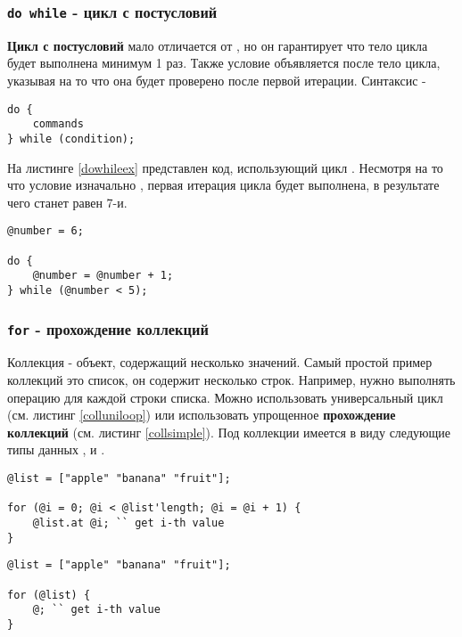 \documentclass[a4paper, 14pt]{extarticle}
\begin{document}
\subsubsection{\lstinline`do while` - цикл с постусловий}

{\bf Цикл с постусловий} мало отличается от , но он гарантирует что тело цикла будет выполнена минимум 1 раз. Также условие объявляется после тело цикла, указывая на то что она будет проверено после первой итерации. Синтаксис -
\begin{lstlisting}[numbers=none]
do {
	commands
} while (condition);
\end{lstlisting}

На листинге \ref{dowhileex} представлен код, использующий цикл . Несмотря на то что условие изначально , первая итерация цикла будет выполнена, в результате чего  станет равен 7-и.

\begin{lstlisting}[caption=Цикл do while, label=dowhileex]
@number = 6;

do {
	@number = @number + 1;
} while (@number < 5);
\end{lstlisting}

\subsubsection{\lstinline`for` - прохождение коллекций}

{Коллекция} - объект, содержащий несколько значений. Самый простой пример коллекций это список, он содержит несколько строк. Например, нужно выполнять операцию для каждой строки списка. Можно использовать универсальный цикл (см. листинг \ref{colluniloop}) или использовать упрощенное {\bf прохождение коллекций} (см. листинг \ref{collsimple}). Под коллекции имеется в виду следующие типы данных ,  и .
\begin{lstlisting}[caption=Прохождение коллекций с помощью универсального цикла, label=colluniloop]
@list = ["apple" "banana" "fruit"];

for (@i = 0; @i < @list'length; @i = @i + 1) {
	@list.at @i; `` get i-th value
}
\end{lstlisting}

\begin{lstlisting}[caption=Упрощённое прохождение коллекций, label=collsimple]
@list = ["apple" "banana" "fruit"];

for (@list) {
	@; `` get i-th value
}
\end{lstlisting}
\end{document}
